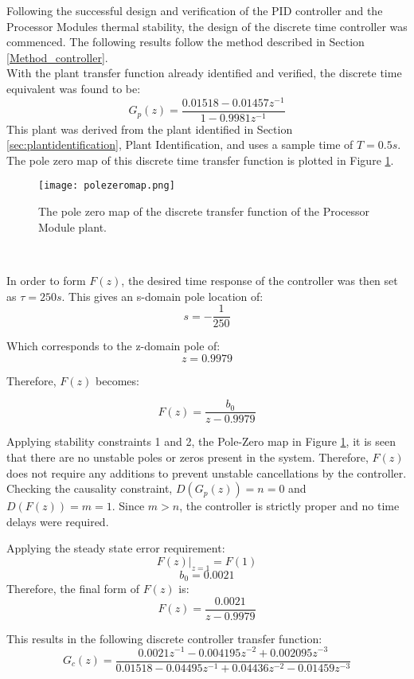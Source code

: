 Following the successful design and verification of the PID controller and the Processor Modules thermal stability, the design of the discrete time controller was commenced. The following results follow the method described in Section \ref{Method_controller}.\\

With the plant transfer function already identified and verified, the discrete time equivalent was found to be:
$$ G_p(z) = \frac{0.01518 - 0.01457z^{-1}}{1 - 0.9981z^{-1}} $$
This plant was derived from the plant identified in Section \ref{sec:plantidentification}, Plant Identification, and uses a sample time of $T=0.5s$. The pole zero map of this discrete time transfer function is plotted in Figure \ref{fig:polezeromap}.

\begin{figure}[!htb]
	\centering
	\texttt{[image: polezeromap.png]}
	\caption[Discrete Plant Transfer Function Pole Zero Map.]{The pole zero map of the discrete transfer function of the Processor Module plant.}
	\label{fig:polezeromap}
\end{figure} 
\FloatBarrier

In order to form $F(z)$, the desired time response of the controller was then set as $\tau = 250s$. This gives an s-domain pole location of:
$$s=-\frac{1}{250}$$

Which corresponds to the z-domain pole of:
$$z=0.9979$$

Therefore, $F(z)$ becomes:

$$F(z) = \frac{b_0}{z - 0.9979}$$

Applying stability constraints 1 and 2, the Pole-Zero map in Figure \ref{fig:polezeromap}, it is seen that there are no unstable poles or zeros present in the system. Therefore, $F(z)$ does not require any additions to prevent unstable cancellations by the controller.\\

Checking the causality constraint, $D(G_p(z)) = n = 0$ and $D(F(z)) = m = 1$. Since $m>n$, the controller is strictly proper and no time delays were required.

Applying the steady state error requirement:
$$F(z)|_{z=1} = F(1)$$
$$b_0 = 0.0021$$
Therefore, the final form of $F(z)$ is:
$$F(z) = \frac{0.0021}{z-0.9979}$$

This results in the following discrete controller transfer function:
$$G_c(z) = \frac{0.0021z^{-1} - 0.004195z^{-2} + 0.002095z^{-3}}{0.01518 - 0.04495z^{-1} + 0.04436z^{-2} - 0.01459z^{-3}}$$

